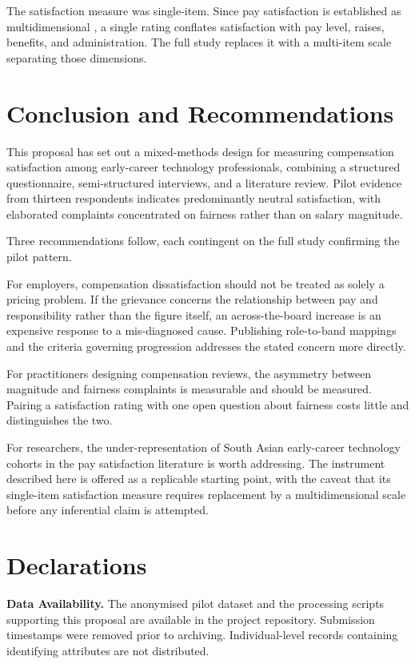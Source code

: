 \documentclass[conference]{IEEEtran}
\begin{document}
The satisfaction measure was single-item. Since pay satisfaction is
established as multidimensional \cite{heneman1985pay}, a single rating
conflates satisfaction with pay level, raises, benefits, and
administration. The full study replaces it with a multi-item scale
separating those dimensions.

\section{Conclusion and Recommendations}

This proposal has set out a mixed-methods design for measuring
compensation satisfaction among early-career technology professionals,
combining a structured questionnaire, semi-structured interviews, and a
literature review. Pilot evidence from thirteen respondents indicates
predominantly neutral satisfaction, with elaborated complaints
concentrated on fairness rather than on salary magnitude.

Three recommendations follow, each contingent on the full study
confirming the pilot pattern.

For employers, compensation dissatisfaction should not be treated as
solely a pricing problem. If the grievance concerns the relationship
between pay and responsibility rather than the figure itself, an
across-the-board increase is an expensive response to a
mis-diagnosed cause. Publishing role-to-band mappings and the criteria
governing progression addresses the stated concern more directly.

For practitioners designing compensation reviews, the asymmetry between
magnitude and fairness complaints is measurable and should be measured.
Pairing a satisfaction rating with one open question about fairness costs
little and distinguishes the two.

For researchers, the under-representation of South Asian early-career
technology cohorts in the pay satisfaction literature is worth
addressing. The instrument described here is offered as a replicable
starting point, with the caveat that its single-item satisfaction measure
requires replacement by a multidimensional scale before any inferential
claim is attempted.

\section*{Declarations}

\textbf{Data Availability.} The anonymised pilot dataset and the
processing scripts supporting this proposal are available in the
project repository. Submission timestamps were removed prior to
archiving. Individual-level records containing identifying attributes
are not distributed.
\end{document}
